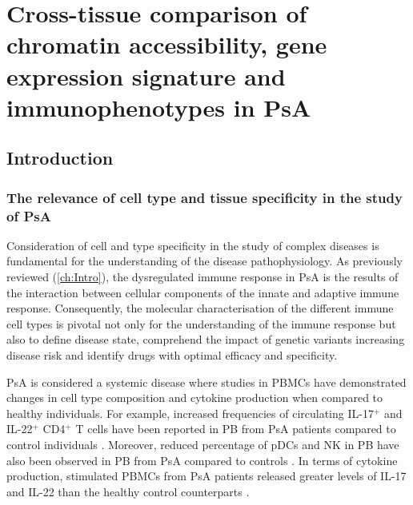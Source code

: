 \chapter{Cross-tissue comparison of chromatin accessibility, gene expression signature and immunophenotypes in PsA}
\label{ch:Results3}



\section{Introduction}

\subsection{The relevance of cell type and tissue specificity in the study of PsA}

Consideration of cell and type specificity in the study of complex diseases is fundamental for the understanding of the disease pathophysiology. As previously reviewed (\ref{ch:Intro}), the dysregulated immune response in PsA is the results of the interaction between cellular components of the innate and adaptive immune response. Consequently, the molecular characterisation of the different immune cell types is pivotal not only for the understanding of the immune response but also to define disease state, comprehend the impact of genetic variants increasing disease risk and identify drugs with optimal efficacy and specificity.

PsA is considered a systemic disease where studies in PBMCs have demonstrated changes in cell type composition and cytokine production when compared to healthy individuals. For example, increased frequencies of circulating IL-17$^+$ and IL-22$^+$ CD4$^+$ T cells have been reported in PB from PsA patients compared to control individuals \parencite{Benham2013}. Moreover, reduced percentage of pDCs and NK in PB have also been observed in PB from PsA compared to controls \parencite{Jongbloed2006, Spadaro2004}. In terms of cytokine production, stimulated PBMCs from PsA patients released greater levels of IL-17 and IL-22 than the healthy control counterparts \parencite{Benham2013}. 

